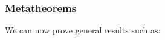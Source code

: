 \begin{frame}[fragile]
\frametitle{Metatheorems}
We can now prove general results such as:

\begin{code}%
\> \AgdaSymbol{:}  \AgdaSymbol{\{}\AgdaSymbol{\}} \AgdaSymbol{\{}\AgdaSymbol{\}} \AgdaSymbol{\{}\AgdaSymbol{\}} \AgdaSymbol{\{}\AgdaSymbol{\}} \AgdaSymbol{\{}\AgdaSymbol{\}}\<%
\\
\>[0]\<[2]%
\>[2]\AgdaSymbol{(} \AgdaSymbol{:}    \AgdaSymbol{)} \AgdaSymbol{\{} \AgdaSymbol{:}   \AgdaSymbol{\}} \AgdaSymbol{\{} \AgdaSymbol{:}   \AgdaSymbol{\}} \<%
\\
\>[0]\<[2]%
\>[2]             \<%
\end{code}
\end{frame}

